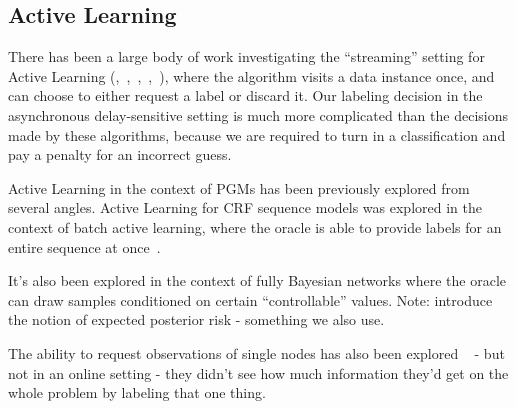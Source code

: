 \subsection{Active Learning}

 

There has been a large body of work investigating the ``streaming'' setting for Active Learning (\cite{chu2011unbiased},~\cite{agarwal2013selective},~\cite{cheng2013feedback},~\cite{vzliobaite2011active},~\cite{helmbold1997some}), where the algorithm visits a data instance once, and can choose to either request a label or discard it.
Our labeling decision in the asynchronous delay-sensitive setting is much more complicated than the decisions made by these algorithms, because we are required to turn in a classification and pay a penalty for an incorrect guess.


Active Learning in the context of PGMs has been previously explored from several angles.
Active Learning for CRF sequence models was explored in the context of batch active learning, where the oracle is able to provide labels for an entire sequence at once~\cite{settles2008analysis}.

It's also been explored in the context of fully Bayesian networks where the oracle\cite{tong2000active} can draw samples conditioned on certain ``controllable'' values.
Note: \cite{tong2000active} introduce the notion of expected posterior risk - something we also use.

The ability to request observations of single nodes has also been explored ~\cite{angeli2014combining} - but not in an online setting - they didn't see how much information they'd get on the whole problem by labeling that one thing.


